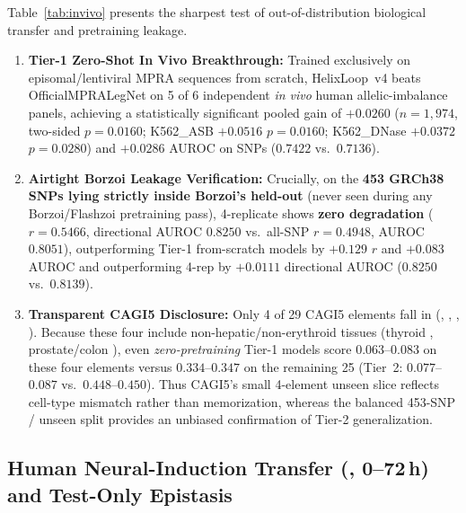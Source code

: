 \documentclass[10.5pt,a4paper]{article}
\begin{document}
Table~\ref{tab:invivo} presents the sharpest test of out-of-distribution biological transfer and pretraining leakage.
\begin{enumerate}
\item \textbf{Tier-1 Zero-Shot In Vivo Breakthrough:} Trained exclusively on episomal/lentiviral MPRA sequences from scratch, HelixLoop~v4 beats OfficialMPRALegNet on 5 of 6 independent \emph{in vivo} human allelic-imbalance panels, achieving a statistically significant pooled gain of $+0.0260$ ($n=1{,}974$, two-sided $p=0.0160$; K562\_ASB $+0.0516$ $p=0.0160$; K562\_DNase $+0.0372$ $p=0.0280$) and $+0.0286$ AUROC on  SNPs ($0.7422$ vs.\ $0.7136$).
\item \textbf{Airtight Borzoi Leakage Verification:} Crucially, on the \textbf{453 GRCh38 SNPs lying strictly inside Borzoi's held-out } (never seen during any Borzoi/Flashzoi pretraining pass), 4-replicate  shows \textbf{zero degradation} ($r=0.5466$, directional AUROC $\mathbf{0.8250}$ vs.\ all-SNP $r=0.4948$, AUROC $0.8051$), outperforming Tier-1 from-scratch models by $+0.129$ $r$ and $+0.083$ AUROC and outperforming 4-rep  by $+0.0111$ directional AUROC ($0.8250$ vs.\ $0.8139$).
\item \textbf{Transparent CAGI5  Disclosure:} Only 4 of 29 CAGI5 elements fall in  (, , , ). Because these four include non-hepatic/non-erythroid tissues (thyroid , prostate/colon ), even \emph{zero-pretraining} Tier-1 models score $0.063$--$0.083$ on these four elements versus $0.334$--$0.347$ on the remaining 25 (Tier~2: $0.077$--$0.087$ vs.\ $0.448$--$0.450$). Thus CAGI5's small 4-element unseen slice reflects cell-type mismatch rather than memorization, whereas the balanced 453-SNP / unseen split provides an unbiased confirmation of Tier-2 generalization.
\end{enumerate}

\subsection{Human Neural-Induction Transfer (, 0--72\,h) and Test-Only Epistasis}
\end{document}
